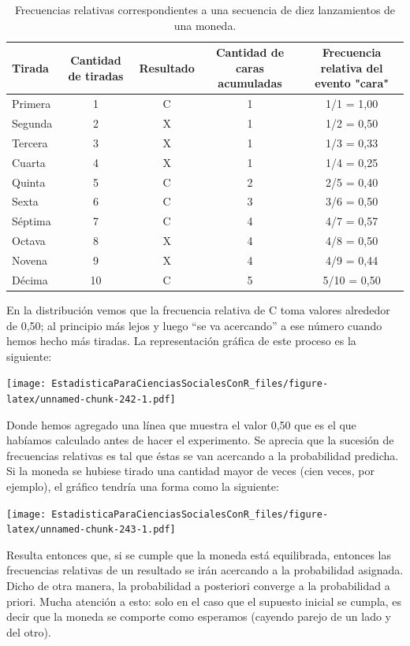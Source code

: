 \documentclass[]{book}
\begin{document}
\begin{table}

\caption{\label{tab:unnamed-chunk-241}Frecuencias relativas correspondientes a una secuencia de diez lanzamientos de una moneda.}
\centering
\begin{tabular}[t]{lcccc}
\toprule
Tirada & Cantidad de tiradas & Resultado & Cantidad de caras acumuladas & Frecuencia relativa del evento "cara"\\
\midrule
\rowcolor{gray!6}  Primera & 1 & C & 1 & 1/1 = 1,00\\
Segunda & 2 & X & 1 & 1/2 = 0,50\\
\rowcolor{gray!6}  Tercera & 3 & X & 1 & 1/3 = 0,33\\
Cuarta & 4 & X & 1 & 1/4 = 0,25\\
\rowcolor{gray!6}  Quinta & 5 & C & 2 & 2/5 = 0,40\\
\addlinespace
Sexta & 6 & C & 3 & 3/6 = 0,50\\
\rowcolor{gray!6}  Séptima & 7 & C & 4 & 4/7 = 0,57\\
Octava & 8 & X & 4 & 4/8 = 0,50\\
\rowcolor{gray!6}  Novena & 9 & X & 4 & 4/9 = 0,44\\
Décima & 10 & C & 5 & 5/10 = 0,50\\
\bottomrule
\end{tabular}
\end{table}

En la distribución vemos que la frecuencia relativa de C toma valores
alrededor de 0,50; al principio más lejos y luego ``se va acercando'' a
ese número cuando hemos hecho más tiradas. La representación gráfica de
este proceso es la siguiente:

\texttt{[image: EstadisticaParaCienciasSocialesConR\_files/figure-latex/unnamed-chunk-242-1.pdf]}

Donde hemos agregado una línea que muestra el valor 0,50 que es el que habíamos calculado antes de hacer el experimento. Se aprecia que la sucesión de frecuencias relativas es tal que éstas se van acercando a la
probabilidad predicha. Si la moneda se hubiese tirado una cantidad mayor de veces (cien veces, por ejemplo), el gráfico tendría una forma como la siguiente:

\texttt{[image: EstadisticaParaCienciasSocialesConR\_files/figure-latex/unnamed-chunk-243-1.pdf]}

Resulta entonces que, si se cumple que la moneda está equilibrada,
entonces las frecuencias relativas de un resultado se irán acercando a la probabilidad asignada. Dicho de otra manera, la probabilidad a
posteriori converge a la probabilidad a priori. Mucha atención a esto: solo en el caso que el supuesto inicial se cumpla, es decir que la moneda se comporte como esperamos (cayendo parejo de un lado y del
otro).
\end{document}
